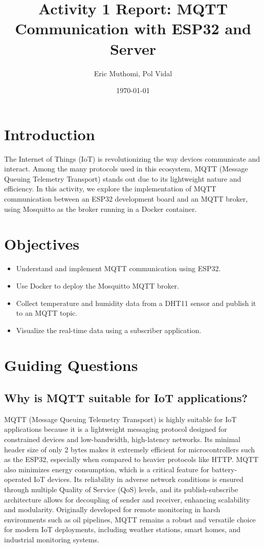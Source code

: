 \documentclass[a4paper,12pt]{article}
\title{Activity 1 Report: MQTT Communication with ESP32 and Server}
\author{Eric Muthomi, Pol Vidal}
\date{\today}
\begin{document}
\maketitle

\section{Introduction}
The Internet of Things (IoT) is revolutionizing the way devices communicate and interact. Among the many protocols used in this ecosystem, MQTT (Message Queuing Telemetry Transport) stands out due to its lightweight nature and efficiency. In this activity, we explore the implementation of MQTT communication between an ESP32 development board and an MQTT broker, using Mosquitto as the broker running in a Docker container.

\section{Objectives}
\begin{itemize}
    \item Understand and implement MQTT communication using ESP32.
    \item Use Docker to deploy the Mosquitto MQTT broker.
    \item Collect temperature and humidity data from a DHT11 sensor and publish it to an MQTT topic.
    \item Visualize the real-time data using a subscriber application.
\end{itemize}

\section{Guiding Questions}

\subsection*{Why is MQTT suitable for IoT applications?}
MQTT (Message Queuing Telemetry Transport) is highly suitable for IoT applications because it is a lightweight messaging protocol designed for constrained devices and low-bandwidth, high-latency networks. Its minimal header size of only 2 bytes makes it extremely efficient for microcontrollers such as the ESP32, especially when compared to heavier protocols like HTTP. MQTT also minimizes energy consumption, which is a critical feature for battery-operated IoT devices. Its reliability in adverse network conditions is ensured through multiple Quality of Service (QoS) levels, and its publish-subscribe architecture allows for decoupling of sender and receiver, enhancing scalability and modularity. Originally developed for remote monitoring in harsh environments such as oil pipelines, MQTT remains a robust and versatile choice for modern IoT deployments, including weather stations, smart homes, and industrial monitoring systems.
\end{document}
